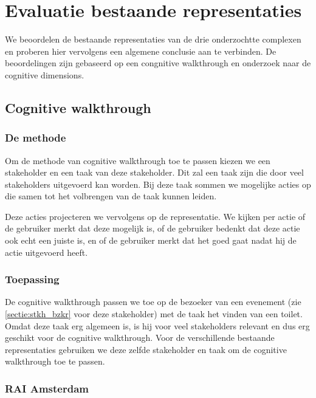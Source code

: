 \chapter{Evaluatie bestaande representaties}

We beoordelen de bestaande representaties van de drie onderzochtte complexen en proberen hier vervolgens een algemene conclusie aan te verbinden. De beoordelingen zijn gebaseerd op een congnitive walkthrough en onderzoek naar de cognitive dimensions.


\section{Cognitive walkthrough}


\subsection{De methode} \label{sectie:cw_methode}

Om de methode van cognitive walkthrough toe te passen kiezen we een stakeholder en een taak van deze stakeholder. Dit zal een taak zijn die door veel stakeholders uitgevoerd kan worden. Bij deze taak sommen we mogelijke acties op die samen tot het volbrengen van de taak kunnen leiden.

Deze acties projecteren we vervolgens op de representatie. We kijken per actie of de gebruiker merkt dat deze mogelijk is, of de gebruiker bedenkt dat deze actie ook echt een juiste is, en of de gebruiker merkt dat het goed gaat nadat hij de actie uitgevoerd heeft.


\subsection{Toepassing} \label{sectie:cw_toepassing}

De cognitive walkthrough passen we toe op de bezoeker van een evenement (zie \ref{sectie:stkh_bzkr} voor deze stakeholder) met de taak het vinden van een toilet. Omdat deze taak erg algemeen is, is hij voor veel stakeholders relevant en dus erg geschikt voor de cognitive walkthrough. Voor de verschillende bestaande representaties gebruiken we deze zelfde stakeholder en taak om de cognitive walkthrough toe te passen.


\subsection{RAI Amsterdam}

